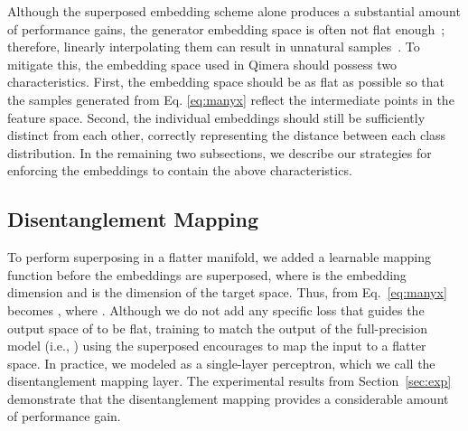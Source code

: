 \documentclass{article}
\newcommand{\aname}{Qimera\xspace}
\begin{document}
Although the superposed embedding scheme alone produces a substantial amount of performance gains, the generator embedding space is often not flat enough~\cite{oddity}; therefore, linearly interpolating them can result in unnatural samples~\cite{laine}.
To mitigate this, the embedding space used in \aname should possess two characteristics. 
First, the embedding space should be as flat as possible so that the samples generated from Eq. \ref{eq:manyx} reflect the intermediate points in the feature space.
Second, the individual embeddings should still be sufficiently distinct from each other, correctly representing the distance between each class distribution.
In the remaining two subsections, we describe our strategies for enforcing the embeddings to contain the above characteristics.


\subsection{Disentanglement Mapping}
To perform superposing in a flatter manifold, we added a learnable mapping function  before the embeddings are superposed, where  is the embedding dimension and  is the dimension of the target space.
Thus,  from Eq.~\ref{eq:manyx} becomes , where .
Although we do not add any specific loss that guides the output space of  to be flat, training to match the output of the full-precision model (i.e., ) using the superposed  encourages  to map the input to a flatter space.
In practice, we modeled  as a single-layer perceptron, which we call the disentanglement mapping layer.
The experimental results from Section~\ref{sec:exp} demonstrate that the disentanglement mapping provides a considerable amount of performance gain. 
\end{document}

